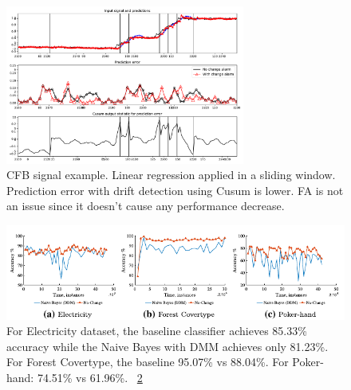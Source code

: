 \documentclass[12 pt]{article}
\begin{document}
  \begin{figure}[!htb]
    \centering
    \includegraphics[width=0.7\textwidth]{images/proof_of_concept_linreg_cfb_sig}
    \caption{CFB signal example.  Linear regression applied in a sliding window.  Prediction error with drift detection using Cusum is lower.  FA is not an issue since it doesn't cause any performance decrease.}\label{fig:cfb_sig_linreg_proof_of_concept}
  \end{figure}

  \begin{figure}[htb!]
    \centering
    \includegraphics[height=0.15\textheight]{images_cropped/souza_fig7}
    \caption{
  For Electricity dataset, the baseline classifier achieves 85.33\% accuracy while the Naive Bayes with DMM achieves only 81.23\%. For Forest Covertype, the baseline 95.07\% vs 88.04\%. For Poker-hand: 74.51\% vs 61.96\%.
  ~\ref{fig:fig7_souza}
    }\label{fig:fig7_souza}
  \end{figure}
\end{document}
